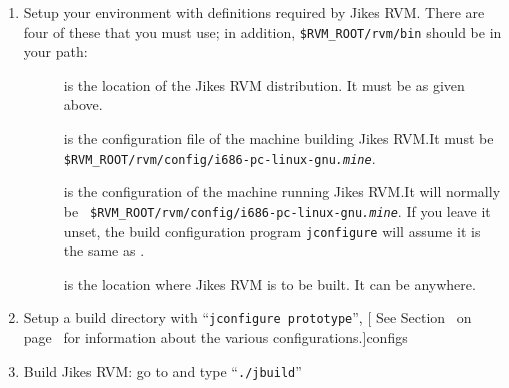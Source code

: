 \begin{enumerate}
%
\item Setup your environment with definitions required by Jikes RVM.\@
There are four of these that you must use; in addition,
{\tt \$RVM\_\-ROOT/rvm/bin} should be in your path:

\begin{description}

\item[] is the location of the Jikes RVM distribution.  It
must be  as given above.

\item[] is the configuration file of the machine
building Jikes RVM.\@  It must be
{\tt \$RVM\_\-ROOT/rvm/config/i686-pc-linux-gnu{\it .mine}}.

\item[] is the configuration of the
  machine running Jikes RVM.\@  It will normally be {\tt
  \$RVM\_\-ROOT/rvm/config/i686-pc-linux-gnu{\it .mine}}.  If you
  leave it unset, the build configuration program {\tt jconfigure}
  will assume it is the same as .

\item[] is the location where Jikes RVM is to be built.  It
can be anywhere.

\end{description}

\item Setup a build directory with ``{\tt jconfigure prototype}'', [  See Section~\Ref{} on page~\Pageref{}
for information about the various configurations.]{configs}

\item Build Jikes RVM: go to  and type ``{\tt ./jbuild}''

\end{enumerate}

\newcommand{\gccURL}{ftp://ftp.gnu.org/gnu/gcc}
\newcommand{\glibcURL}{ftp://ftp.gnu.org/gnu/glibc}
\newcommand{\makeURL}{ftp://ftp.gnu.org/gnu/make}
\newcommand{\bashURL}{ftp://ftp.gnu.org/gnu/bash}
\newcommand{\bisonURL}{ftp://ftp.gnu.org/gnu/bison}
\newcommand{\tarURL}{ftp://ftp.gnu.org/gnu/tar}
\newcommand{\autoconfURL}{ftp://ftp.gnu.org/gnu/autoconf}
\newcommand{\automakeURL}{ftp://ftp.gnu.org/gnu/automake}
\newcommand{\wgetURL}{ftp://ftp.gnu.org/gnu/wget}
\newcommand{\cvsURL}{http://www.cvshome.org}
\newcommand{\linuxPPCJDKURL}{http://www.ibm.com/java/jdk/linux/index.html}
\newcommand{\linuxKernelURL}{http://www.kernel.org}

